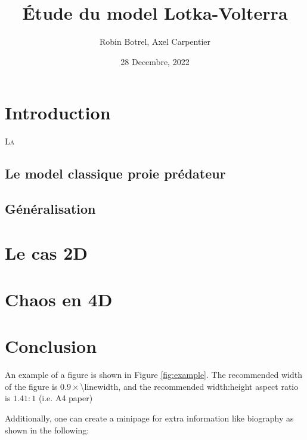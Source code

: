 \documentclass{wsdcr}
\title{Étude du model Lotka-Volterra}
\author{Robin Botrel, Axel Carpentier}
\affil{\textit{Université Paul Sabatier}\\
\textit{Toulouse, France}}
\date{28 Decembre, 2022}
\begin{document}
\maketitle

\section{Introduction}
\lettrine{L}{a}  
\subsection{Le model classique proie prédateur}
\subsection{Généralisation}
\section{Le cas 2D}
\section{Chaos en 4D}
\section{Conclusion}


An example of a figure is shown in Figure \ref{fig:example}. The recommended width of the figure is $0.9\times$\textbackslash linewidth, and the recommended width:height aspect ratio is $1.41:1$ (i.e. A4 paper)

Additionally, one can create a minipage for extra information like biography as shown in the following:


\end{document}
